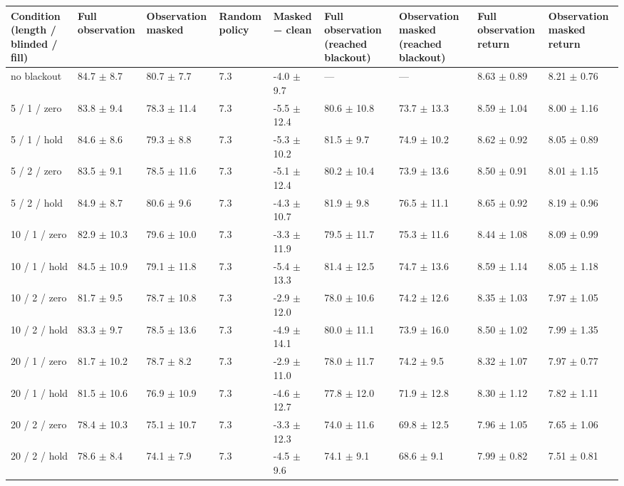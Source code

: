 \begin{tabular}{lllllllll}
\toprule
Condition (length / blinded / fill) & Full observation & Observation masked & Random policy & Masked − clean & Full observation (reached blackout) & Observation masked (reached blackout) & Full observation return & Observation masked return \\
\midrule
no blackout & 84.7 $\pm$ 8.7 & 80.7 $\pm$ 7.7 & 7.3 & -4.0 $\pm$ 9.7 & — & — & 8.63 $\pm$ 0.89 & 8.21 $\pm$ 0.76 \\
5 / 1 / zero & 83.8 $\pm$ 9.4 & 78.3 $\pm$ 11.4 & 7.3 & -5.5 $\pm$ 12.4 & 80.6 $\pm$ 10.8 & 73.7 $\pm$ 13.3 & 8.59 $\pm$ 1.04 & 8.00 $\pm$ 1.16 \\
5 / 1 / hold & 84.6 $\pm$ 8.6 & 79.3 $\pm$ 8.8 & 7.3 & -5.3 $\pm$ 10.2 & 81.5 $\pm$ 9.7 & 74.9 $\pm$ 10.2 & 8.62 $\pm$ 0.92 & 8.05 $\pm$ 0.89 \\
5 / 2 / zero & 83.5 $\pm$ 9.1 & 78.5 $\pm$ 11.6 & 7.3 & -5.1 $\pm$ 12.4 & 80.2 $\pm$ 10.4 & 73.9 $\pm$ 13.6 & 8.50 $\pm$ 0.91 & 8.01 $\pm$ 1.15 \\
5 / 2 / hold & 84.9 $\pm$ 8.7 & 80.6 $\pm$ 9.6 & 7.3 & -4.3 $\pm$ 10.7 & 81.9 $\pm$ 9.8 & 76.5 $\pm$ 11.1 & 8.65 $\pm$ 0.92 & 8.19 $\pm$ 0.96 \\
10 / 1 / zero & 82.9 $\pm$ 10.3 & 79.6 $\pm$ 10.0 & 7.3 & -3.3 $\pm$ 11.9 & 79.5 $\pm$ 11.7 & 75.3 $\pm$ 11.6 & 8.44 $\pm$ 1.08 & 8.09 $\pm$ 0.99 \\
10 / 1 / hold & 84.5 $\pm$ 10.9 & 79.1 $\pm$ 11.8 & 7.3 & -5.4 $\pm$ 13.3 & 81.4 $\pm$ 12.5 & 74.7 $\pm$ 13.6 & 8.59 $\pm$ 1.14 & 8.05 $\pm$ 1.18 \\
10 / 2 / zero & 81.7 $\pm$ 9.5 & 78.7 $\pm$ 10.8 & 7.3 & -2.9 $\pm$ 12.0 & 78.0 $\pm$ 10.6 & 74.2 $\pm$ 12.6 & 8.35 $\pm$ 1.03 & 7.97 $\pm$ 1.05 \\
10 / 2 / hold & 83.3 $\pm$ 9.7 & 78.5 $\pm$ 13.6 & 7.3 & -4.9 $\pm$ 14.1 & 80.0 $\pm$ 11.1 & 73.9 $\pm$ 16.0 & 8.50 $\pm$ 1.02 & 7.99 $\pm$ 1.35 \\
20 / 1 / zero & 81.7 $\pm$ 10.2 & 78.7 $\pm$ 8.2 & 7.3 & -2.9 $\pm$ 11.0 & 78.0 $\pm$ 11.7 & 74.2 $\pm$ 9.5 & 8.32 $\pm$ 1.07 & 7.97 $\pm$ 0.77 \\
20 / 1 / hold & 81.5 $\pm$ 10.6 & 76.9 $\pm$ 10.9 & 7.3 & -4.6 $\pm$ 12.7 & 77.8 $\pm$ 12.0 & 71.9 $\pm$ 12.8 & 8.30 $\pm$ 1.12 & 7.82 $\pm$ 1.11 \\
20 / 2 / zero & 78.4 $\pm$ 10.3 & 75.1 $\pm$ 10.7 & 7.3 & -3.3 $\pm$ 12.3 & 74.0 $\pm$ 11.6 & 69.8 $\pm$ 12.5 & 7.96 $\pm$ 1.05 & 7.65 $\pm$ 1.06 \\
20 / 2 / hold & 78.6 $\pm$ 8.4 & 74.1 $\pm$ 7.9 & 7.3 & -4.5 $\pm$ 9.6 & 74.1 $\pm$ 9.1 & 68.6 $\pm$ 9.1 & 7.99 $\pm$ 0.82 & 7.51 $\pm$ 0.81 \\

\end{tabular}
